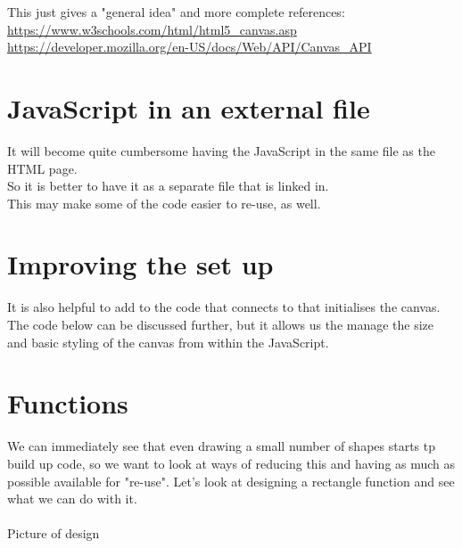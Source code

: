 \documentclass[a4paper,12pt]{article}
\begin{document}
This just gives a "general idea" and more complete references:\\
\url{https://www.w3schools.com/html/html5_canvas.asp}\\
\url{https://developer.mozilla.org/en-US/docs/Web/API/Canvas_API}\\
\section{JavaScript in an external file}
It will become quite cumbersome having the JavaScript in the same file as the HTML page.\\
So it is better to have it as a separate file that is linked in.\\
This may make some of the code easier to re-use, as well.

\section{Improving the set up}
It is also helpful to add to the code that connects to that initialises the canvas.\\
The code below can be discussed further, but it allows us the manage the size and basic styling of the canvas from within the JavaScript.


\newpage
\section{Functions}
We can immediately see that even drawing a small number of shapes starts tp build up code, so we want to look at ways of reducing this and having as much as possible available for "re-use".
Let's look at designing a rectangle function and see what we can do with it.\\\\
Picture of design\vspace{10cm}
\end{document}
